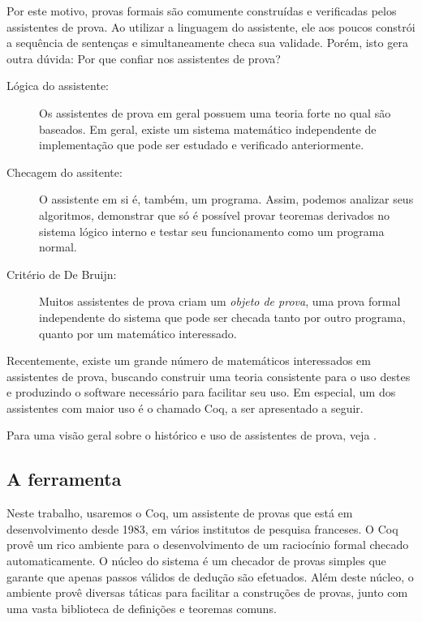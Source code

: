 Por este motivo, provas formais são comumente construídas e verificadas pelos
assistentes de prova. Ao utilizar a linguagem do assistente, ele aos poucos
constrói a sequência de sentenças e simultaneamente checa sua validade. Porém,
isto gera outra dúvida: Por que confiar nos assistentes de prova?


\begin{description}
    \item[Lógica do assistente:] Os assistentes de prova em geral possuem uma
        teoria forte no qual são baseados. Em geral, existe um sistema
        matemático independente de implementação que pode ser estudado e
        verificado anteriormente.
    \item[Checagem do assitente:] O assistente em si é, também, um programa. Assim,
        podemos analizar seus algoritmos, demonstrar que só é possível provar
        teoremas derivados no sistema lógico interno e testar seu funcionamento
        como um programa normal.
    \item[Critério de De Bruijn:] Muitos assistentes de prova criam um
        \emph{objeto de prova}, uma prova formal independente do sistema que
        pode ser checada tanto por outro programa, quanto por um matemático
        interessado.  
\end{description}

Recentemente, existe um grande número de matemáticos interessados em assistentes
de prova, buscando construir uma teoria consistente para o uso destes e
produzindo o software necessário para facilitar seu uso. Em especial, um dos
assistentes com maior uso é o chamado Coq, a ser apresentado a seguir.

Para uma visão geral sobre o histórico e uso de assistentes de prova, veja
\cite{proof_assist}. 

\subsection{A ferramenta}

Neste trabalho, usaremos o Coq, um assistente de provas que está em
desenvolvimento desde 1983, em vários institutos de pesquisa franceses. O Coq
provê um rico ambiente para o desenvolvimento de um raciocínio formal checado
automaticamente. O núcleo do sistema é um checador de provas simples que garante
que apenas passos válidos de dedução são efetuados. Além deste núcleo, o
ambiente provê diversas táticas para facilitar a construções de provas, junto
com uma vasta biblioteca de definições e teoremas comuns.


